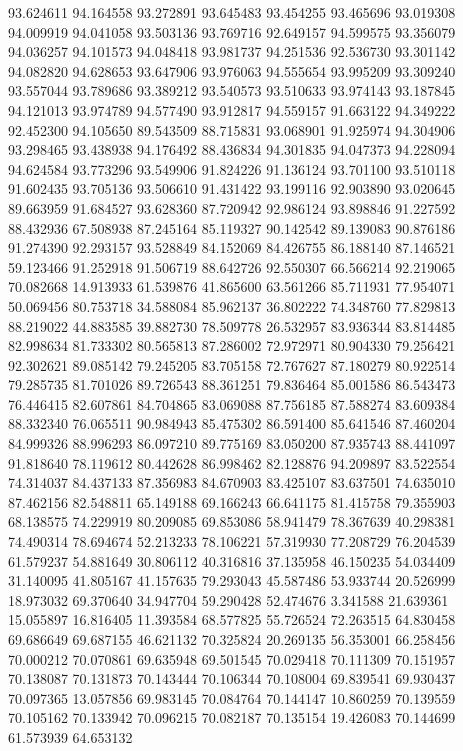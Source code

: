 93.624611
94.164558
93.272891
93.645483
93.454255
93.465696
93.019308
94.009919
94.041058
93.503136
93.769716
92.649157
94.599575
93.356079
94.036257
94.101573
94.048418
93.981737
94.251536
92.536730
93.301142
94.082820
94.628653
93.647906
93.976063
94.555654
93.995209
93.309240
93.557044
93.789686
93.389212
93.540573
93.510633
93.974143
93.187845
94.121013
93.974789
94.577490
93.912817
94.559157
91.663122
94.349222
92.452300
94.105650
89.543509
88.715831
93.068901
91.925974
94.304906
93.298465
93.438938
94.176492
88.436834
94.301835
94.047373
94.228094
94.624584
93.773296
93.549906
91.824226
91.136124
93.701100
93.510118
91.602435
93.705136
93.506610
91.431422
93.199116
92.903890
93.020645
89.663959
91.684527
93.628360
87.720942
92.986124
93.898846
91.227592
88.432936
67.508938
87.245164
85.119327
90.142542
89.139083
90.876186
91.274390
92.293157
93.528849
84.152069
84.426755
86.188140
87.146521
59.123466
91.252918
91.506719
88.642726
92.550307
66.566214
92.219065
70.082668
14.913933
61.539876
41.865600
63.561266
85.711931
77.954071
50.069456
80.753718
34.588084
85.962137
36.802222
74.348760
77.829813
88.219022
44.883585
39.882730
78.509778
26.532957
83.936344
83.814485
82.998634
81.733302
80.565813
87.286002
72.972971
80.904330
79.256421
92.302621
89.085142
79.245205
83.705158
72.767627
87.180279
80.922514
79.285735
81.701026
89.726543
88.361251
79.836464
85.001586
86.543473
76.446415
82.607861
84.704865
83.069088
87.756185
87.588274
83.609384
88.332340
76.065511
90.984943
85.475302
86.591400
85.641546
87.460204
84.999326
88.996293
86.097210
89.775169
83.050200
87.935743
88.441097
91.818640
78.119612
80.442628
86.998462
82.128876
94.209897
83.522554
74.314037
84.437133
87.356983
84.670903
83.425107
83.637501
74.635010
87.462156
82.548811
65.149188
69.166243
66.641175
81.415758
79.355903
68.138575
74.229919
80.209085
69.853086
58.941479
78.367639
40.298381
74.490314
78.694674
52.213233
78.106221
57.319930
77.208729
76.204539
61.579237
54.881649
30.806112
40.316816
37.135958
46.150235
54.034409
31.140095
41.805167
41.157635
79.293043
45.587486
53.933744
20.526999
18.973032
69.370640
34.947704
59.290428
52.474676
3.341588
21.639361
15.055897
16.816405
11.393584
68.577825
55.726524
72.263515
64.830458
69.686649
69.687155
46.621132
70.325824
20.269135
56.353001
66.258456
70.000212
70.070861
69.635948
69.501545
70.029418
70.111309
70.151957
70.138087
70.131873
70.143444
70.106344
70.108004
69.839541
69.930437
70.097365
13.057856
69.983145
70.084764
70.144147
10.860259
70.139559
70.105162
70.133942
70.096215
70.082187
70.135154
19.426083
70.144699
61.573939
64.653132

